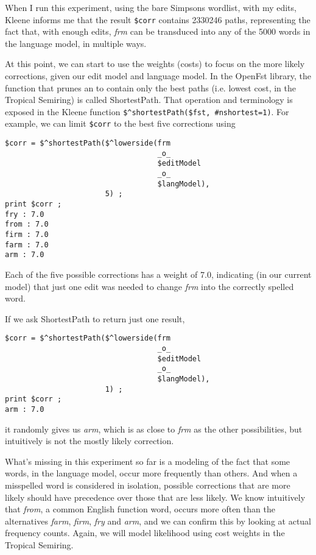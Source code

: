 \noindent
When I run this experiment, using the bare Simpsons wordlist, with my edits, Kleene
informs me that the result \texttt{\$corr} contains 2330246 paths, representing
the fact that, with enough edits, \emph{frm} can be transduced into any of the
5000 words in the language model, in multiple ways.

At this point, we can start to use the weights (costs) to focus on the more
likely corrections, given our edit model and language model.  In the OpenFst
library, the function that prunes an \fsm{} to contain only the best paths (i.e.\@
lowest cost, in the Tropical Semiring) is called ShortestPath.  That operation
and terminology is exposed in the Kleene function \verb!$^shortestPath($fst, #nshortest=1)!.  For
example, we can limit \verb!$corr! to the best five corrections using

\begin{Verbatim}
$corr = $^shortestPath($^lowerside(frm 
                                   _o_ 
                                   $editModel 
                                   _o_ 
                                   $langModel), 
                       5) ;
print $corr ;
fry : 7.0
from : 7.0
firm : 7.0
farm : 7.0
arm : 7.0
\end{Verbatim}

\noindent
Each of the five possible corrections has a weight of 7.0, indicating (in our
current model) that just one edit was needed to change \emph{frm} into the correctly
spelled word.  

If we ask ShortestPath to return just one result,

\begin{Verbatim}
$corr = $^shortestPath($^lowerside(frm 
                                   _o_ 
                                   $editModel 
                                   _o_ 
                                   $langModel), 
                       1) ;
print $corr ;
arm : 7.0
\end{Verbatim}

\noindent
it randomly gives us \emph{arm}, which is as close to \emph{frm} as the other possibilities,
but intuitively is not the mostly likely correction.  

What's missing in this experiment so far is a modeling of the fact that some
words, in the language model, occur more frequently than others.  And when a
misspelled word is considered in isolation, possible corrections that are more
likely should have precedence over those that are less likely.  We
know intuitively that \emph{from}, a common English function word, occurs more often than the
alternatives \emph{farm}, \emph{firm}, \emph{fry} and \emph{arm},  and we can confirm this by looking at actual frequency counts.  Again, we will
model likelihood using cost weights in the Tropical Semiring.


